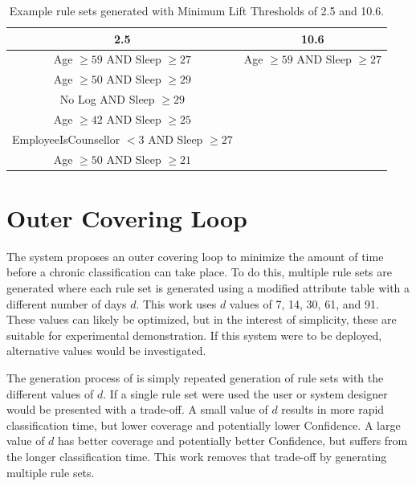 \begin{table}[h]
	\centering

	\begin{tabular}{cc}
	\toprule
	2.5 & 10.6 \\
	\midrule
	Age $\geq 59$ AND Sleep $\geq 27$ & Age $\geq 59$ AND Sleep $\geq 27$ \\
	Age $\geq 50$ AND Sleep $\geq 29$ & \\
	No Log AND Sleep $\geq 29$ & \\
	Age $\geq 42$ AND Sleep $\geq 25$ & \\
	EmployeeIsCounsellor $< 3$ AND Sleep $\geq 27$ & \\
	Age $\geq 50$ AND Sleep $\geq 21$ & \\
	\bottomrule
	\end{tabular}

	\caption{Example rule sets generated with Minimum Lift Thresholds of 2.5 and 10.6.}
	\label{tbl:algo:exampleminlift}
\end{table}


\section{Outer Covering Loop} \label{chap:algo:proposed}


The \Abb system proposes an outer covering loop to minimize the amount of time before a chronic classification can take place. To do this, multiple rule sets are generated where each rule set is generated using a modified attribute table with a different number of days $d$. This work uses $d$ values of 7, 14, 30, 61, and 91. These values can likely be optimized, but in the interest of simplicity, these are suitable for experimental demonstration. If this system were to be deployed, alternative values would be investigated. 

The generation process of \Abb is simply repeated generation of rule sets with the different values of $d$. If a single rule set were used the user or system designer would be presented with a trade-off. A small value of $d$ results in more rapid classification time, but lower coverage and potentially lower Confidence. A large value of $d$ has better coverage and potentially better Confidence, but suffers from the longer classification time. This work removes that trade-off by generating multiple rule sets. 


